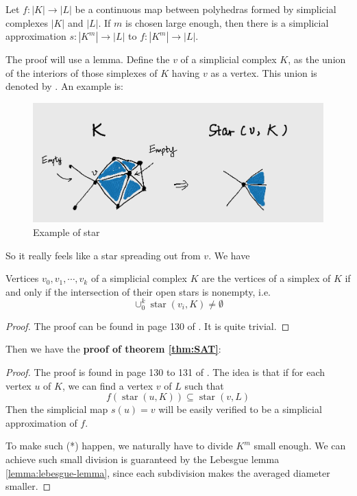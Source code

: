 \begin{thm}
    \label{thm:SAT}
    Let $f:|K|\to |L|$ be a continuous map between polyhedras formed
    by simplicial complexes $|K|$ and $|L|$. If $m$ is chosen large
    enough, then there is a simplicial approximation $s:|K^m|\to|L|$
    to $f:|K^m|\to|L|$.
\end{thm}
The proof will use a lemma. Define the  $v$ of a
simplicial complex $K$, as the union of the interiors of those
simplexes of $K$ having $v$ as a vertex. This union is denoted by
. An example is:
\begin{figure}[H]
    \centering
    \includegraphics[width=1.0\linewidth]{pics/ch6-notes-2/ex5.png}
    \caption{Example of star}
\end{figure}
So it really feels like a star spreading out from $v$. We have

\begin{lemma}
    Vertices $v_0,v_1,\cdots,v_k$ of a simplicial complex $K$ are the
    vertices of a simplex of $K$ if and only if the intersection of
    their open stars is nonempty, i.e. 
    $$\cup_0^k \operatorname{star}(v_i,K)\neq\emptyset$$
\end{lemma}
\begin{proof}
    The proof can be found in page 130 of \cite{book}. It is quite
    trivial.
\end{proof}
Then we have the \textbf{proof of theorem \ref{thm:SAT}}:
\begin{proof}
    The proof is found in page 130 to 131 of \cite{book}. The idea is
    that if for each vertex $u$ of $K$, we can find a vertex $v$ of
    $L$ such that
    \begin{equation}
        f(\operatorname{star}(u,K))\subseteq\operatorname{star}(v,L)
        \label{eq:proof-temp} \tag{*} 
    \end{equation}
    Then the simplicial map $s(u)=v$ will be easily verified to be a
    simplicial approximation of $f$. 
    
    To make such (*) happen, we naturally have to divide $K^m$ small
    enough. We can achieve such small division is guaranteed by the
    Lebesgue lemma \ref{lemma:lebesgue-lemma}, since each subdivision
    makes the averaged diameter smaller.
\end{proof}

